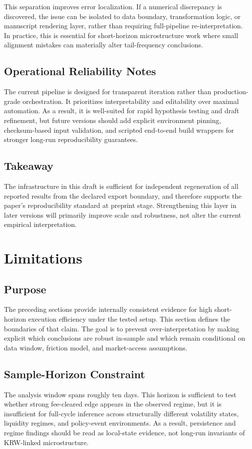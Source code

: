 \documentclass[11pt,a4paper]{article}
\begin{document}
This separation improves error localization. If a numerical discrepancy is discovered, the issue can be isolated to data boundary, transformation logic, or manuscript rendering layer, rather than requiring full-pipeline re-interpretation. In practice, this is essential for short-horizon microstructure work where small alignment mistakes can materially alter tail-frequency conclusions.

\subsection{Operational Reliability Notes}
The current pipeline is designed for transparent iteration rather than production-grade orchestration. It prioritizes interpretability and editability over maximal automation. As a result, it is well-suited for rapid hypothesis testing and draft refinement, but future versions should add explicit environment pinning, checksum-based input validation, and scripted end-to-end build wrappers for stronger long-run reproducibility guarantees.

\subsection{Takeaway}
The infrastructure in this draft is sufficient for independent regeneration of all reported results from the declared export boundary, and therefore supports the paper's reproducibility standard at preprint stage. Strengthening this layer in later versions will primarily improve scale and robustness, not alter the current empirical interpretation.

\section{Limitations}
\subsection{Purpose}
The preceding sections provide internally consistent evidence for high short-horizon execution efficiency under the tested setup. This section defines the boundaries of that claim. The goal is to prevent over-interpretation by making explicit which conclusions are robust in-sample and which remain conditional on data window, friction model, and market-access assumptions.

\subsection{Sample-Horizon Constraint}
The analysis window spans roughly ten days. This horizon is sufficient to test whether strong fee-cleared edge appears in the observed regime, but it is insufficient for full-cycle inference across structurally different volatility states, liquidity regimes, and policy-event environments. As a result, persistence and regime findings should be read as local-state evidence, not long-run invariants of KRW-linked microstructure.
\end{document}
